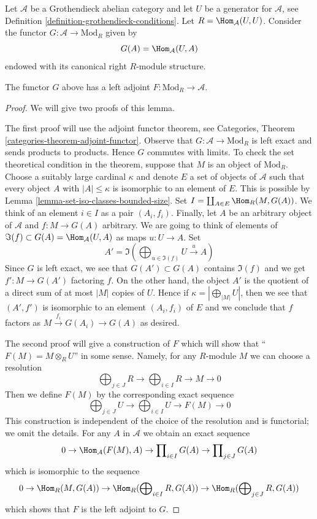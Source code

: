 \medskip\noindent
Let $\mathcal{A}$ be a Grothendieck abelian category and let $U$ be a
generator for $\mathcal{A}$, see
Definition \ref{definition-grothendieck-conditions}.
Let $R = \Hom_\mathcal{A}(U, U)$. Consider the functor
$G : \mathcal{A} \to \text{Mod}_R$ given by
$$
G(A) = \Hom_\mathcal{A}(U, A)
$$
endowed with its canonical right $R$-module structure.

\begin{lemma}
\label{lemma-gabriel-popescu-left-adjoint}
The functor $G$ above has a left adjoint
$F : \text{Mod}_R \to \mathcal{A}$.
\end{lemma}

\begin{proof}
We will give two proofs of this lemma.

\medskip\noindent
The first proof will use the adjoint functor theorem, see
Categories, Theorem \ref{categories-theorem-adjoint-functor}.
Observe that $G : \mathcal{A} \to \text{Mod}_R$ is left exact and sends
products to products. Hence $G$ commutes with limits. To check the set
theoretical condition in the theorem, suppose that $M$ is an object of
$\text{Mod}_R$. Choose a suitably large cardinal $\kappa$ and denote $E$
a set of objects of $\mathcal{A}$ such that every object $A$ with
$|A| \leq \kappa$ is isomorphic to an element of $E$. This is possible
by Lemma \ref{lemma-set-iso-classes-bounded-size}. Set
$I = \coprod_{A \in E} \Hom_R(M, G(A))$.
We think of an element $i \in I$ as a pair $(A_i, f_i)$.
Finally, let $A$ be an arbitrary object of $\mathcal{A}$
and $f : M \to G(A)$ arbitrary. We are going to think of
elements of $\Im(f) \subset G(A) = \Hom_\mathcal{A}(U, A)$
as maps $u : U \to A$. Set
$$
A' = \Im(\bigoplus\nolimits_{u \in \Im(f)} U \xrightarrow{u} A)
$$
Since $G$ is left exact, we see that $G(A') \subset G(A)$
contains $\Im(f)$ and we get $f' : M \to G(A')$ factoring $f$.
On the other hand, the object $A'$ is
the quotient of a direct sum of at most $|M|$ copies of $U$.
Hence if $\kappa = |\bigoplus_{|M|} U|$, then we see that $(A', f')$
is isomorphic to an element $(A_i, f_i)$ of $E$ and we conclude that $f$
factors as $M \xrightarrow{f_i} G(A_i) \to G(A)$ as desired.

\medskip\noindent
The second proof will give a construction of $F$ which will show
that ``$F(M) = M \otimes_R U$'' in some sense. Namely, for any
$R$-module $M$ we can choose a resolution
$$
\bigoplus\nolimits_{j \in J} R \to
\bigoplus\nolimits_{i \in I} R \to
M \to 0
$$
Then we define $F(M)$ by the corresponding exact sequence
$$
\bigoplus\nolimits_{j \in J} U \to
\bigoplus\nolimits_{i \in I} U \to
F(M) \to 0
$$
This construction is independent of the choice of the resolution
and is functorial; we omit the details.
For any $A$ in $\mathcal{A}$ we obtain an exact sequence
$$
0 \to \Hom_\mathcal{A}(F(M), A) \to
\prod\nolimits_{i \in I} G(A) \to
\prod\nolimits_{j \in J} G(A)
$$
which is isomorphic to the sequence
$$
0 \to \Hom_R(M, G(A)) \to
\Hom_R(\bigoplus\nolimits_{i \in I} R, G(A)) \to
\Hom_R(\bigoplus\nolimits_{j \in J} R, G(A))
$$
which shows that $F$ is the left adjoint to $G$.
\end{proof}
